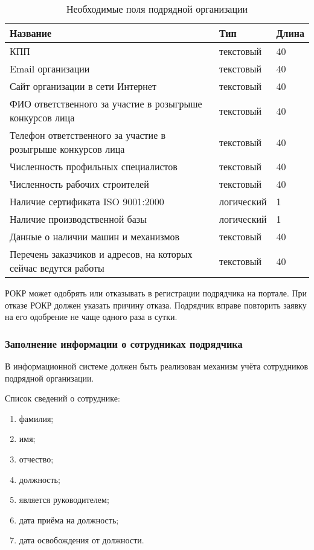 \begin{footnotesize}
\begin{longtable}[h]{|p{}|p{}|p{}|}
	\caption{\label{tab:tech-orgaddfields}Необходимые поля подрядной организации} \\
	\hline
		\textbf{Название} & \textbf{Тип} & \textbf{Длина} \\
	\hline
		КПП & текстовый & 40 \\
	\hline
		Email организации & текстовый & 40 \\
	\hline
		Сайт организации в сети Интернет & текстовый & 40 \\
	\hline
		ФИО ответственного за участие в розыгрыше конкурсов лица & текстовый & 40 \\
	\hline
		Телефон ответственного за участие в розыгрыше конкурсов лица & текстовый & 40 \\
	\hline
		Численность профильных специалистов & текстовый & 40 \\
	\hline
		Численность рабочих строителей & текстовый & 40 \\
	\hline
		Наличие сертификата ISO 9001:2000 & логический & 1 \\
	\hline
		Наличие производственной базы & логический & 1 \\
	\hline
		Данные о наличии машин и механизмов & текстовый & 40 \\
	\hline
		Перечень заказчиков и адресов, на которых сейчас ведутся работы & текстовый & 40 \\
	\hline
\end{longtable}
\end{footnotesize}

РОКР может одобрять или отказывать в регистрации подрядчика на портале.
При отказе РОКР должен указать причину отказа.
Подрядчик вправе повторить заявку на его одобрение не чаще одного раза в сутки.

\subsubsection{Заполнение информации о сотрудниках подрядчика}

В информационной системе должен быть реализован механизм учёта сотрудников подрядной организации.

Список сведений о сотруднике:

\begin{enumerate}
	\item фамилия;
	\item имя;
	\item отчество;
	\item должность;
	\item является руководителем;
	\item дата приёма на должность;
	\item дата освобождения от должности.
\end{enumerate}

